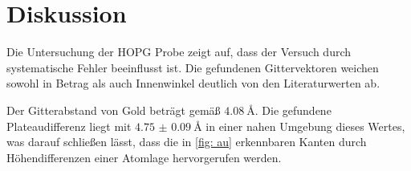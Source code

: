 \section{Diskussion}
Die Untersuchung der HOPG Probe zeigt auf, dass der Versuch durch systematische Fehler
beeinflusst ist. Die
gefundenen Gittervektoren weichen sowohl in Betrag als auch Innenwinkel deutlich von den Literaturwerten
ab.

Der Gitterabstand von Gold beträgt gemäß \cite{} $\SI{4.08}{\angstrom}$. Die gefundene Plateaudifferenz
liegt mit $\SI{4.75(9)}{\angstrom}$ in einer nahen Umgebung dieses Wertes, was darauf schließen lässt,
dass die in \ref{fig: au} erkennbaren Kanten durch Höhendifferenzen einer Atomlage hervorgerufen werden.
